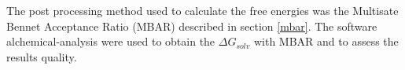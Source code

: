 The post processing method used to calculate the free energies was the Multisate Bennet Acceptance Ratio (MBAR) described in section \ref{mbar}. The software alchemical-analysis \cite{klimovich} were used to obtain the $\Delta G_{solv}$ with MBAR and to assess the results quality.


